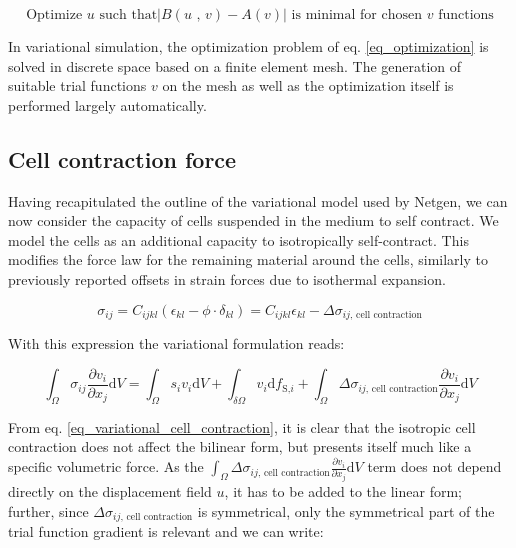 \documentclass[11pt]{amsart}
\begin{document}
\begin{equation}
\text{Optimize }u\text{ such that} \left| B\left(u\text{ , }v\right)-A\left(v\right) \right| \text{ is minimal for chosen } v \text{ functions}\label{eq_optimization} 
\end{equation}

In variational simulation, the optimization problem of eq. \ref{eq_optimization} is solved in discrete space based on a finite element mesh. The generation of suitable trial functions $v$ on the mesh as well as the optimization itself is performed largely automatically\cite{gangl_fully_2020}.
 
\subsection{Cell contraction force}

Having recapitulated the outline of the variational model used by Netgen, we can now consider the capacity of cells suspended in the medium to self contract. We model the cells as an additional capacity to isotropically self-contract. This modifies the force law for the remaining material around the cells, similarly to previously reported offsets in strain forces due to isothermal expansion\cite{camara_phenomenological_2006}.

\begin{equation}
\sigma_{ij}=C_{ijkl}\left(\epsilon_{kl} - \phi\cdot \delta _{kl}\right)=C_{ijkl}\epsilon_{kl}-\Delta \sigma_{ij\text{, cell contraction}}
\end{equation}

With this expression the variational formulation reads:

\begin{equation}
\int_\Omega \sigma_{ij} \frac{\partial v_i}{\partial x_j} \text{d}V=\int_\Omega s_i v_i \text{d}V+\int_{\delta\Omega} v_i\text{d}f_{\text{S,}i}+\int_\Omega \Delta \sigma_{ij\text{, cell contraction}} \frac{\partial v_i}{\partial x_j} \text{d}V \label{eq_variational_cell_contraction}
\end{equation}

From eq. \ref{eq_variational_cell_contraction}, it is clear that the isotropic cell contraction does not affect the bilinear form, but presents itself much like a specific volumetric force. As the $\int_\Omega \Delta \sigma_{ij\text{, cell contraction}} \frac{\partial v_i}{\partial x_j} \text{d}V$ term does not depend directly on the displacement field $u$, it has to be added to the linear form; further, since $\Delta \sigma_{ij\text{, cell contraction}}$ is symmetrical, only the symmetrical part of the trial function gradient is relevant and we can write: 
\end{document}
